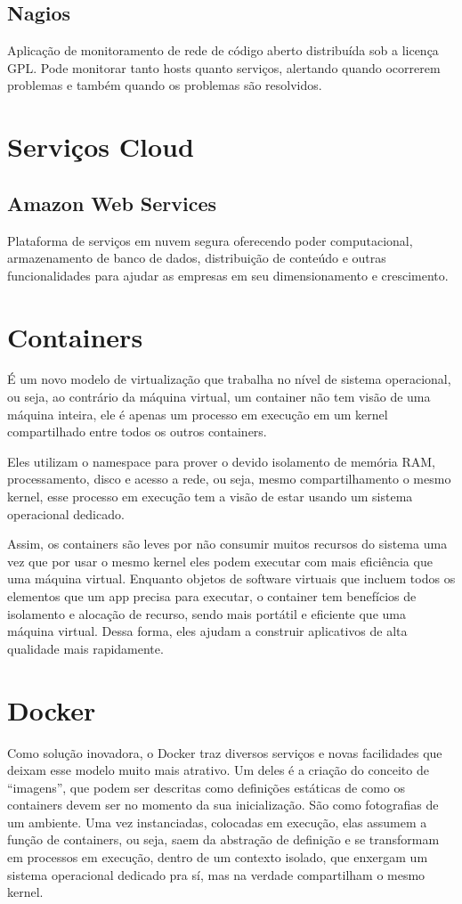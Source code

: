 	\subsection{Nagios} Aplicação de monitoramento de rede de código 
	aberto distribuída sob a licença GPL. Pode monitorar tanto hosts 
	quanto serviços, alertando quando ocorrerem problemas e também 
	quando os problemas são resolvidos.

    \section{Serviços Cloud}

	\subsection{Amazon Web Services} Plataforma de serviços em nuvem 
	segura oferecendo poder computacional, armazenamento de banco de 
	dados, distribuição de conteúdo e outras funcionalidades para 
	ajudar as empresas em seu dimensionamento e crescimento.
	
\section{Containers}
É um novo modelo de virtualização que trabalha no nível de sistema operacional, 
ou seja, ao contrário da máquina virtual, um container não tem visão de uma 
máquina inteira, ele é apenas um processo em execução em um kernel compartilhado 
entre todos os outros containers.

Eles utilizam o namespace para prover o devido isolamento de memória RAM, 
processamento, disco e acesso a rede, ou seja, mesmo compartilhamento o 
mesmo kernel, esse processo em execução tem a visão de estar usando um 
sistema operacional dedicado.

Assim, os containers são leves por não consumir muitos recursos do 
sistema uma vez que por usar o mesmo kernel eles podem executar com 
mais eficiência que uma máquina virtual. Enquanto objetos de software 
virtuais que incluem todos os elementos que um app precisa para executar, 
o container tem benefícios de isolamento e alocação de recurso, sendo 
mais portátil e eficiente que uma máquina virtual. Dessa forma, eles 
ajudam a construir aplicativos de alta qualidade mais rapidamente.

\section{Docker}
Como solução inovadora, o Docker traz diversos serviços e novas 
facilidades que deixam esse modelo muito mais atrativo. Um deles 
é a criação do conceito de “imagens”, que podem ser descritas como 
definições estáticas de como os containers devem ser no momento da 
sua inicialização. São como fotografias de um ambiente. Uma vez 
instanciadas, colocadas em execução, elas assumem a função de 
containers, ou seja, saem da abstração de definição e se transformam 
em processos em execução, dentro de um contexto isolado, que 
enxergam um sistema operacional dedicado pra sí, mas na verdade 
compartilham o mesmo kernel.

